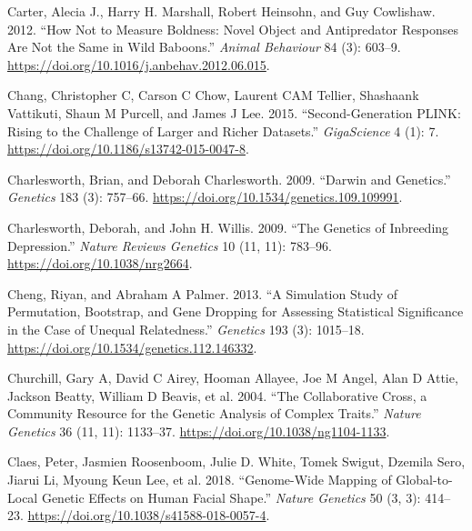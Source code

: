 \documentclass[
]{book}
\newlength{\cslhangindent}
\newlength{\cslentryspacingunit} %
\newenvironment{CSLReferences}[2] %
 {%
  \setlength{\parindent}{0pt}
  \ifodd #1
  \let\oldpar\par
  \def\par{\hangindent=\cslhangindent\oldpar}
  \fi
  \setlength{\parskip}{#2\cslentryspacingunit}
 }%
 {}
\begin{document}
\begin{CSLReferences}{1}{0}
\leavevmode{}%
Carter, Alecia J., Harry H. Marshall, Robert Heinsohn, and Guy Cowlishaw. 2012. {``How Not to Measure Boldness: Novel Object and Antipredator Responses Are Not the Same in Wild Baboons.''} \emph{Animal Behaviour} 84 (3): 603--9. \url{https://doi.org/10.1016/j.anbehav.2012.06.015}.

\leavevmode{}%
Chang, Christopher C, Carson C Chow, Laurent CAM Tellier, Shashaank Vattikuti, Shaun M Purcell, and James J Lee. 2015. {``Second-Generation {PLINK}: Rising to the Challenge of Larger and Richer Datasets.''} \emph{GigaScience} 4 (1): 7. \url{https://doi.org/10.1186/s13742-015-0047-8}.

\leavevmode{}%
Charlesworth, Brian, and Deborah Charlesworth. 2009. {``Darwin and {Genetics}.''} \emph{Genetics} 183 (3): 757--66. \url{https://doi.org/10.1534/genetics.109.109991}.

\leavevmode{}%
Charlesworth, Deborah, and John H. Willis. 2009. {``The Genetics of Inbreeding Depression.''} \emph{Nature Reviews Genetics} 10 (11, 11): 783--96. \url{https://doi.org/10.1038/nrg2664}.

\leavevmode{}%
Cheng, Riyan, and Abraham A Palmer. 2013. {``A {Simulation Study} of {Permutation}, {Bootstrap}, and {Gene Dropping} for {Assessing Statistical Significance} in the {Case} of {Unequal Relatedness}.''} \emph{Genetics} 193 (3): 1015--18. \url{https://doi.org/10.1534/genetics.112.146332}.

\leavevmode{}%
Churchill, Gary A, David C Airey, Hooman Allayee, Joe M Angel, Alan D Attie, Jackson Beatty, William D Beavis, et al. 2004. {``The {Collaborative Cross}, a Community Resource for the Genetic Analysis of Complex Traits.''} \emph{Nature Genetics} 36 (11, 11): 1133--37. \url{https://doi.org/10.1038/ng1104-1133}.

\leavevmode{}%
Claes, Peter, Jasmien Roosenboom, Julie D. White, Tomek Swigut, Dzemila Sero, Jiarui Li, Myoung Keun Lee, et al. 2018. {``Genome-Wide Mapping of Global-to-Local Genetic Effects on Human Facial Shape.''} \emph{Nature Genetics} 50 (3, 3): 414--23. \url{https://doi.org/10.1038/s41588-018-0057-4}.


\end{CSLReferences}
\end{document}
